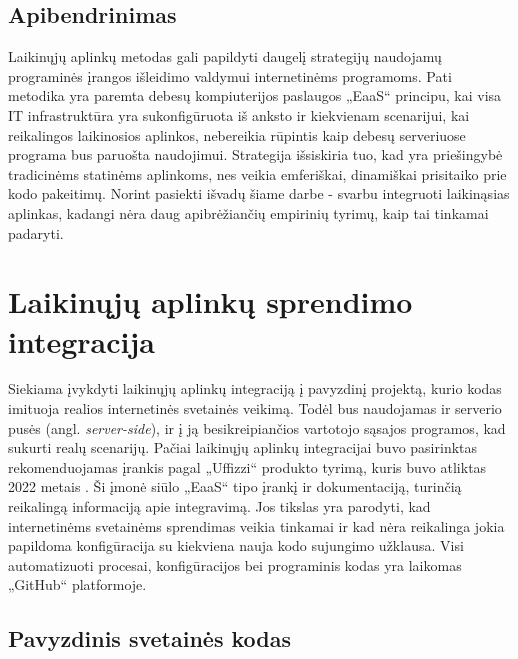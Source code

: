 \documentclass{VUMIFPSkursinis}
\begin{document}


\subsection{Apibendrinimas}

Laikinųjų aplinkų metodas gali papildyti daugelį strategijų naudojamų programinės įrangos išleidimo valdymui internetinėms programoms. Pati metodika yra paremta debesų kompiuterijos paslaugos „EaaS“ principu, kai visa IT infrastruktūra yra sukonfigūruota iš anksto ir kiekvienam scenarijui, kai reikalingos laikinosios aplinkos, nebereikia rūpintis kaip debesų serveriuose programa bus paruošta naudojimui. Strategija išsiskiria tuo, kad yra priešingybė tradicinėms statinėms aplinkoms, nes veikia emferiškai, dinamiškai prisitaiko prie kodo pakeitimų. Norint pasiekti išvadų šiame darbe - svarbu integruoti laikinąsias aplinkas, kadangi nėra daug apibrėžiančių empirinių tyrimų, kaip tai tinkamai padaryti.


\section{Laikinųjų aplinkų sprendimo integracija}

Siekiama įvykdyti laikinųjų aplinkų integraciją į pavyzdinį projektą, kurio kodas imituoja realios internetinės svetainės veikimą. Todėl bus naudojamas ir serverio pusės (angl. \textit{server-side}), ir į ją besikreipiančios vartotojo sąsajos programos, kad sukurti realų scenarijų. Pačiai laikinųjų aplinkų integracijai buvo pasirinktas rekomenduojamas įrankis pagal „Uffizzi“ produkto tyrimą, kuris buvo atliktas 2022 metais \cite{SaltDvyliktas}. Ši įmonė siūlo „EaaS“ tipo įrankį ir dokumentaciją, turinčią reikalingą informaciją apie integravimą. Jos tikslas yra parodyti, kad internetinėms svetainėms sprendimas veikia tinkamai ir kad nėra reikalinga jokia papildoma konfigūracija su kiekviena nauja kodo sujungimo užklausa. Visi automatizuoti procesai, konfigūracijos bei programinis kodas yra laikomas „GitHub“ platformoje.

\subsection{Pavyzdinis svetainės kodas}
\end{document}

